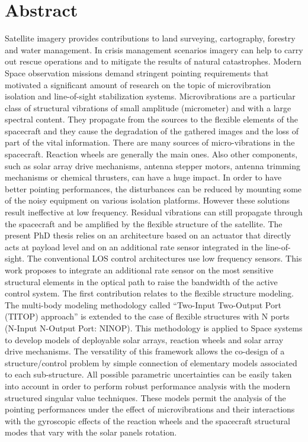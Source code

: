 \chapter*{Abstract}

 Satellite imagery provides contributions to land surveying, cartography, forestry and water management. In crisis management scenarios imagery can help to carry out rescue operations and to mitigate the results of natural catastrophes.
Modern Space observation missions demand stringent pointing requirements that motivated a significant amount of research on the topic of microvibration isolation and line-of-sight stabilization systems. Microvibrations are a particular class of structural vibrations of small amplitude (micrometer) and with a large spectral content. They propagate from the sources to the flexible elements of the spacecraft and they cause the degradation of the gathered images and the loss of part of the vital information. There are many sources of micro-vibrations in the spacecraft. Reaction wheels are generally the main ones. Also other components, such as solar array drive mechanisms, antenna stepper motors, antenna trimming mechanisms or chemical thrusters, can have a huge impact.
In order to have better pointing performances, the disturbances can be reduced by mounting some of the noisy equipment on various isolation platforms. However these solutions result ineffective at low frequency. Residual vibrations can still propagate through the spacecraft and be amplified by the flexible structure of the satellite. The present PhD thesis relies on an architecture based on an actuator that directly acts at payload level and on an additional rate sensor integrated in the line-of-sight. The conventional LOS control architectures use low frequency sensors. This work proposes to integrate an additional rate sensor on the most sensitive structural elements in the optical path to raise the bandwidth of the active control system.
The first contribution relates to the flexible structure modeling. The multi-body modeling methodology called “Two-Input Two-Output Port (TITOP) approach” is extended to the case of flexible structures with N ports (N-Input N-Output Port: NINOP). This methodology is applied to Space systems to develop models of deployable solar arrays, reaction wheels and solar array drive mechanisms.  The versatility of this framework allows the co-design of a structure/control problem by simple connection of elementary models associated to each sub-structure. All possible parametric uncertainties can be easily taken into account in order to perform robust performance analysis with the modern structured singular value techniques. These models permit the analysis of the pointing performances under the effect of microvibrations and their interactions with the gyroscopic effects of the reaction wheels and the spacecraft structural modes that vary with the solar panels rotation.
